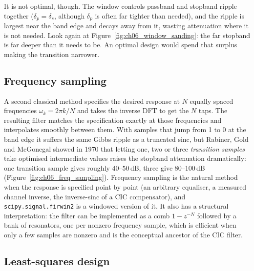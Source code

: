 It is not optimal, though. The window controls passband and stopband ripple together
($\delta_p=\delta_s$, although $\delta_p$ is often far tighter than needed), and the ripple is
largest near the band edge and decays away from it, wasting attenuation where it is not needed.
Look again at Figure~\ref{fig:ch06_window_sanding}: the far stopband is far deeper than it needs to be.
An optimal design would spend that surplus making the transition narrower.

\subsection{Frequency sampling}

A second classical method specifies the desired response at $N$ equally spaced frequencies
$\omega_k=2\pi k/N$ and takes the inverse DFT to get the $N$ taps. The resulting filter matches the
specification exactly at those frequencies and interpolates smoothly between them. With samples that
jump from 1 to 0 at the band edge it suffers the same Gibbs ripple as a truncated sinc, but
Rabiner, Gold and McGonegal showed in 1970 that letting one, two or three \emph{transition samples}
take optimised intermediate values raises the stopband attenuation dramatically: one transition
sample gives roughly 40--50\,dB, three give 80--100\,dB (Figure~\ref{fig:ch06_freq_sampling}).
Frequency sampling is the natural method when the response is specified point by point (an
arbitrary equaliser, a measured channel inverse, the inverse-sinc of a CIC compensator), and
\texttt{scipy.signal.firwin2} is a windowed version of it. It also has a structural interpretation:
the filter can be implemented as a comb $1-z^{-N}$ followed by a bank of resonators, one per nonzero
frequency sample, which is efficient when only a few samples are nonzero and is the conceptual
ancestor of the CIC filter.


\subsection{Least-squares design}

